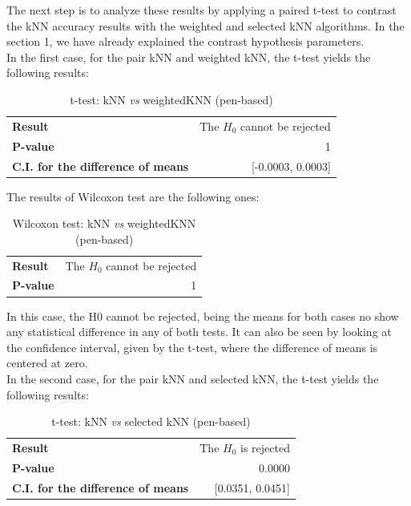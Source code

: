 \documentclass[12pt, a4paper]{article}
\begin{document}
The next step is to analyze these results by applying a paired t-test to contrast the kNN accuracy results with the weighted and selected kNN algorithms. In the section 1, we have already explained the contrast hypothesis parameters.\\

In the first case, for the pair kNN and weighted kNN, the t-test yields the following results:\\
\begin{table}[ht!]
	\centering
	\small
	\begin{tabular}{|lr|}
		\hline
		\textbf{Result} & The $H_0$ cannot be rejected\\
		\textbf{P-value} & 1\\
		\textbf{C.I. for the difference of means} & [-0.0003, 0.0003]\\
		\hline
	\end{tabular}
	\caption{t-test: kNN \emph{vs} weightedKNN (pen-based)}
\end{table}

The results of Wilcoxon test are the following ones:\\
\begin{table}[ht!]
	\centering
	\small
	\begin{tabular}{|lr|}
		\hline
		\textbf{Result} & The $H_0$ cannot be rejected\\
		\textbf{P-value} & 1\\
		\hline
	\end{tabular}
	\caption{Wilcoxon test: kNN \emph{vs} weightedKNN (pen-based)}
\end{table}

In this case, the H0 cannot be rejected, being the means for both cases no show any statistical difference in any of both tests. It can also be seen by looking at the confidence interval, given by the t-test, where the difference of means is centered at zero.\\
\newpage
In the second case, for the pair kNN and selected kNN, the t-test yields the following results:\\
\begin{table}[ht!]
	\centering
	\small
	\begin{tabular}{|lr|}
		\hline
		\textbf{Result} & The $H_0$ is rejected\\
		\textbf{P-value} & 0.0000\\
		\textbf{C.I. for the difference of means} & [0.0351, 0.0451]\\
		\hline
	\end{tabular}
	\caption{t-test: kNN \emph{vs} selected kNN (pen-based)}
\end{table}
\end{document}
